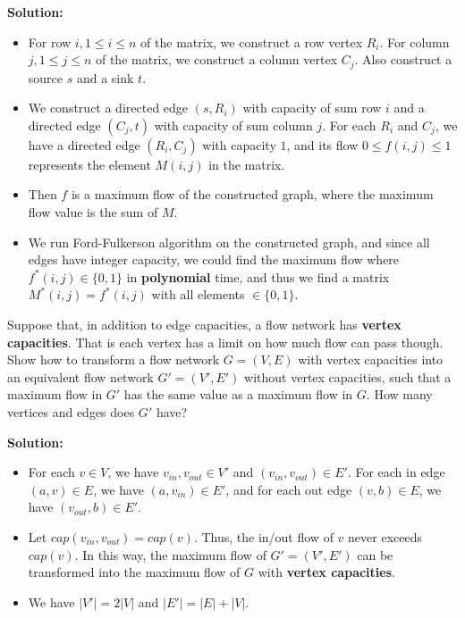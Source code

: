 \documentclass{article}
\newcounter{exercise}
\newcommand{\<}{
    \langle}
\renewcommand{\>}{
    \rangle}
\begin{document}
{\textbf{Solution:}
\begin{itemize}
    \item For row $i,1\leq i\leq n$ of the matrix, we construct a row vertex $R_i$. For column $j,1\leq j\leq n$ of the matrix, we construct a column vertex $C_j$. Also construct a source $s$ and a sink $t$.
    \item We construct a directed edge $(s,R_i)$ with capacity of sum row $i$ and a directed edge $(C_j,t)$ with capacity of sum column $j$. For each $R_i$ and $C_j$, we have a directed edge $(R_i,C_j)$ with capacity $1$, and its flow $0\leq f(i,j)\leq 1$ represents the element $M(i,j)$ in the matrix.
    \item Then $f$ is a maximum flow of the constructed graph, where the maximum flow value is the sum of  $M$.
    \item We run Ford-Fulkerson algorithm on the constructed graph, and since all edges have integer capacity, we could find the maximum flow where $f^*(i,j)\in \{0,1\}$ in \textbf{polynomial} time, and thus we find a matrix $M^*(i,j)=f^*(i,j)$ with all elements $\in \{0,1\}$.
\end{itemize}
\newpage


\begin{exercise}
Suppose that, in addition to edge capacities, a flow network has \textbf{vertex capacities}.
That is each vertex has a limit on how much flow can pass though. Show how to transform a flow network $G=(V,E)$ with vertex capacities into an equivalent flow network $G'=(V',E')$ without vertex capacities, such that a maximum flow in $G'$ has the same value as a maximum flow in $G$. How many vertices and edges does $G'$ have?
\end{exercise}

\textbf{Solution:}
\begin{itemize}
    \item For each $v\in V$, we have $v_{in},v_{out}\in V'$ and $(v_{in},v_{out})\in E'$. For each in edge $(a,v)\in E$, we have $(a,v_{in})\in E'$, and for each out edge $(v,b)\in E$, we have $(v_{out},b)\in E'$.
    \item Let $cap(v_{in},v_{out})=cap(v)$. Thus, the in/out flow of $v$ never exceeds $cap(v)$. In this way, the maximum flow of $G'=(V',E')$ can be transformed into the maximum flow of $G$ with \textbf{vertex capacities}.
    \item We have $|V'|=2|V|$ and $|E'|=|E|+|V|$.
\end{itemize}
\newpage



}
\end{document}
